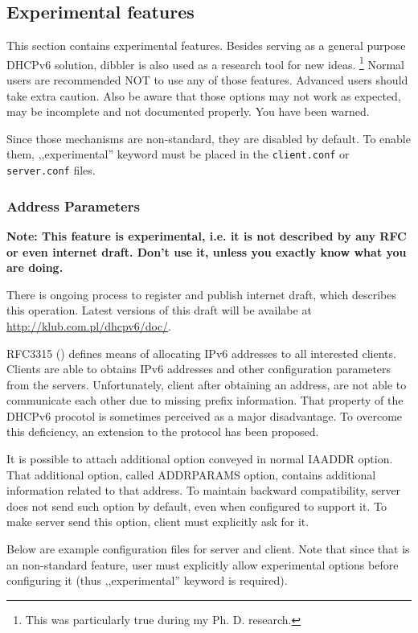 \subsection{Experimental features}

This section contains experimental features. Besides serving as a
general purpose DHCPv6 solution, dibbler is also used as a research
tool for new ideas. \footnote{This was particularly true during my
  Ph. D. research.} Normal users are recommended NOT to use any
of those features. Advanced users should take extra caution. Also be
aware that those options may not work as expected, may be incomplete
and not documented properly. You have been warned.

Since those mechanisms are non-standard, they are disabled by
default. To enable them, ,,experimental'' keyword must be placed in
the \verb+client.conf+ or \verb+server.conf+ files.

\subsubsection{Address Parameters}
\label{feature-addr-params}
\textbf{Note: This feature is experimental, i.e. it is not described
by any RFC or even internet draft. Don't use it, unless you exactly
know what you are doing.}

There is ongoing process to register and publish internet draft,
which describes this operation. Latest versions of this draft will be
availabe at \url{http://klub.com.pl/dhcpv6/doc/}.

RFC3315 (\cite{rfc3315}) defines means of allocating IPv6 addresses to
all interested clients. Clients are able to obtains IPv6 addresses and
other configuration parameters from the servers. Unfortunately, client
after obtaining an address, are not able to communicate each other due
to missing prefix information. That property of the DHCPv6 procotol is
sometimes perceived as a major disadvantage. To overcome this
deficiency, an extension to the protocol has been proposed.

It is possible to attach additional option conveyed in normal IAADDR
option. That additional option, called ADDRPARAMS option, contains
additional information related to that address. To maintain backward
compatibility, server does not send such option by default, even when
configured to support it. To make server send this option, client must
explicitly ask for it.

Below are example configuration files for server and client. Note that
since that is an non-standard feature, user must explicitly allow
experimental options before configuring it (thus ,,experimental''
keyword is required).

